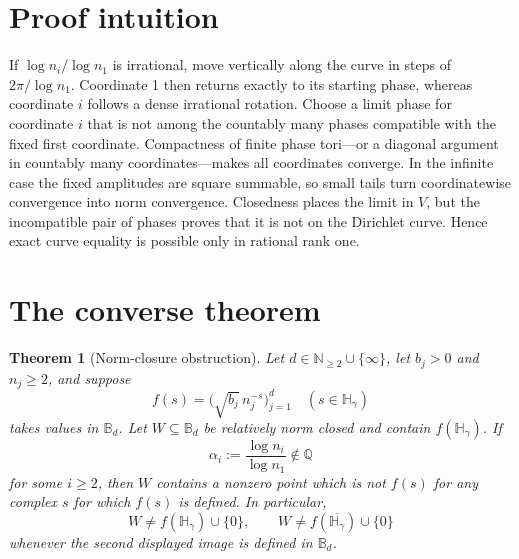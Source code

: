 \documentclass[11pt]{article}
\newtheorem{theorem}{Theorem}
\newcommand{\B}{\mathbb B}
\newcommand{\Hh}{\mathbb H}
\newcommand{\Q}{\mathbb Q}
\newcommand{\N}{\mathbb N}
\begin{document}
\section{Proof intuition}

If $\log n_i/\log n_1$ is irrational, move vertically along the curve in
steps of $2\pi/\log n_1$.  Coordinate 1 then returns exactly to its starting
phase, whereas coordinate $i$ follows a dense irrational rotation.  Choose a
limit phase for coordinate $i$ that is not among the countably many phases
compatible with the fixed first coordinate.  Compactness of finite phase
tori---or a diagonal argument in countably many coordinates---makes all
coordinates converge.  In the infinite case the fixed amplitudes are square
summable, so small tails turn coordinatewise convergence into norm
convergence.  Closedness places the limit in $V$, but the incompatible pair
of phases proves that it is not on the Dirichlet curve.  Hence exact curve
equality is possible only in rational rank one.

\section{The converse theorem}

\begin{theorem}[Norm-closure obstruction]\label{thm:obstruction}
Let $d\in\N_{\ge2}\cup\{\infty\}$, let $b_j>0$ and $n_j\ge2$, and suppose
\[
 f(s)=\bigl(\sqrt{b_j}\,n_j^{-s}\bigr)_{j=1}^d
 \quad(s\in\Hh_\gamma)
\]
takes values in $\B_d$.  Let $W\subseteq\B_d$ be relatively norm closed and
contain $f(\Hh_\gamma)$.  If
\[
 \alpha_i:=\frac{\log n_i}{\log n_1}\notin\Q
\]
for some $i\ge2$, then $W$ contains a nonzero point which is not $f(s)$ for
any complex $s$ for which $f(s)$ is defined.  In particular,
\[
 W\ne f(\Hh_\gamma)\cup\{0\},
 \qquad
 W\ne f(\overline{\Hh_\gamma})\cup\{0\}
\]
whenever the second displayed image is defined in $\B_d$.
\end{theorem}
\end{document}
